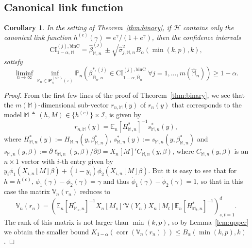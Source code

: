 \documentclass[preprint]{imsart}
\newcommand{\E}{{\mathbb E}}
\newcommand{\VC}{{\mathbb{V}}}
\newcommand{\M}{\mathbb M}
\DeclareMathOperator{\corr}{corr}
\newtheorem{corollary}[theorem]{Corollary}
\numberwithin{equation}{section}
\begin{document}
\subsection{Canonical link function}
\label{sec:binaryCanonical}

\begin{corollary}
\label{corr:binaryCanoncial}
In the setting of Theorem~\ref{thm:binary}, if $\mathcal H$ contains only the canonical link function $h^{(c)}(\gamma) = e^\gamma/(1+e^\gamma)$, then the confidence intervals
\begin{equation}
\mathrm{CI}_{1-\alpha, \mathbb{M}}^{(j), \mathrm{binC}} = \hat{\beta}^{(j)}_{\mathbb{M}, n} \pm  \sqrt{\hat{\sigma}^2_{j,\mathbb{M}, n}} B_{\alpha}(\min(k, p),k),
\end{equation}
satisfy
\begin{equation}
\liminf_{n \to \infty} \inf_{\mathbb{P}_n \in \mathbf{P}_n^{(\mathrm{bin})} 
\left(\tau \right) } \mathbb{P}_n \left(\beta_{\hat{\mathbb{M}}_n, n}^{*, (j)} \in \mathrm{CI}_{1-\alpha, \hat{\mathbb{M}}_n}^{(j), \mathrm{binC}} \;\forall j = 1, \hdots, m(\hat{\mathbb{M}}_n)  \right) \geq 1-\alpha.
\end{equation}
\end{corollary}

\begin{proof}
From the first few lines of the proof of Theorem~\ref{thm:binary}, we see that the $m(\M)$-dimensional sub-vector $r_{n,\M}(y)$ of $r_n(y)$ that corresponds to the model $\M\triangleq (h,M)\in\{h^{(c)}\}\times \mathcal I$, is given by
$$
r_{n,\M}(y) = \E_n[H_{\M,n}^*]^{-1} s_{\M,n}^*(y),
$$
where $H_{\M,n}^*(y) := H_{\M,n}(y,\beta_{\M,n}^*)$, $s_{\M,n}^*(y) := s_{\M,n}(y,\beta_{\M,n}^*)$ and $s_{\M,n}(y,\beta) := \partial \ell_{\M,n}(y,\beta)/\partial \beta = X_n[M]'C_{\M,n}(y,\beta)$, where $C_{\M,n}(y,\beta)$ is an $n\times 1$ vector with $i$-th entry given by $y_i\dot{\phi}_1(X_{i,n}[M]\beta) + (1-y_i)\dot{\phi}_2(X_{i,n}[M]\beta)$. But it is easy to see that for $h=h^{(c)}$, $\phi_1(\gamma) - \phi_2(\gamma) = \gamma$ and thus $\dot{\phi}_1(\gamma) - \dot{\phi}_2(\gamma) = 1$, so that in this case the matrix $\VC_n(r_n)$ reduces to
$$
\VC_n(r_n) = \left(\E_n[H^*_{\M_s,n}]^{-1} X_n[M_s]'\VC(Y_n)X_n[M_t]\E_n[H^*_{\M_t,n}]^{-1}\right)_{s,t=1}^d.
$$  
The rank of this matrix is not larger than $\min(k,p)$, so by Lemma~\ref{lem:upper} we obtain the smaller bound $K_{1-\alpha}(\corr(\VC_n(r_n)))\le B_\alpha(\min(k,p),k)$.
\end{proof}




\end{document}
